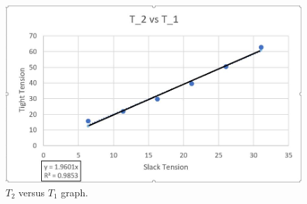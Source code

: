 \begin{figure}[H]
\centering
\includegraphics[width=1\textwidth]{chapters/lab2/m2}
\caption{$T_2$ versus $T_1$ graph.}
\label{fig:mesh3}
\end{figure}